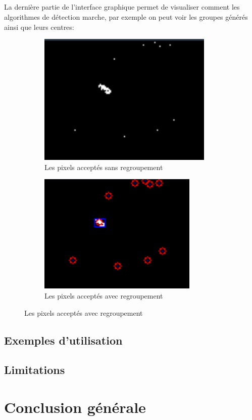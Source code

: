 \documentclass[12pt]{report}
\begin{document}
\paragraph{}
La dernière partie de l’interface graphique permet de visualiser comment les algorithmes de détection marche, par exemple on peut voir les groupes générés ainsi que leurs centres:
\begin{figure}
	\centering
	\begin{subfigure}{.5\textwidth}
		\centering
		\includegraphics[width=.4\linewidth]{imgs/notGrouped.png}
		\caption{Les pixels acceptés sans regroupement}
		\label{fig:sub1}
	\end{subfigure}%
	\begin{subfigure}{.5\textwidth}
		\centering
		\includegraphics[width=.4\linewidth]{imgs/grouped.png}
		\caption{Les pixels acceptés avec regroupement}
		\label{fig:sub2}
	\end{subfigure}
	\label{fig:test}
\end{figure}


\section{Exemples d'utilisation}
\section{Limitations}

\chapter{Conclusion générale}
\paragraph{}
\end{document}
